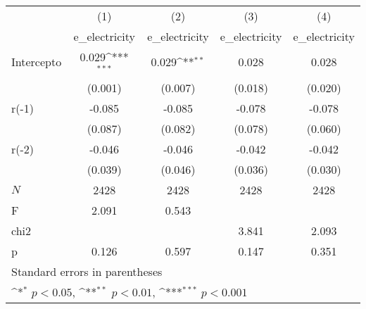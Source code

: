 {
\def\sym#1{\ifmmode^{#1}\else\(^{#1}\)\fi}
\begin{longtable}{l*{4}{c}}
\hline\hline\endfirsthead\hline\endhead\hline\endfoot\endlastfoot
            &\multicolumn{1}{c}{(1)}&\multicolumn{1}{c}{(2)}&\multicolumn{1}{c}{(3)}&\multicolumn{1}{c}{(4)}\\
            &\multicolumn{1}{c}{e\_electricity}&\multicolumn{1}{c}{e\_electricity}&\multicolumn{1}{c}{e\_electricity}&\multicolumn{1}{c}{e\_electricity}\\
\hline
Intercepto  &       0.029\sym{***}&       0.029\sym{**} &       0.028         &       0.028         \\
            &     (0.001)         &     (0.007)         &     (0.018)         &     (0.020)         \\
r(-1)       &      -0.085         &      -0.085         &      -0.078         &      -0.078         \\
            &     (0.087)         &     (0.082)         &     (0.078)         &     (0.060)         \\
r(-2)       &      -0.046         &      -0.046         &      -0.042         &      -0.042         \\
            &     (0.039)         &     (0.046)         &     (0.036)         &     (0.030)         \\
\hline
\(N\)       &        2428         &        2428         &        2428         &        2428         \\
F           &       2.091         &       0.543         &                     &                     \\
chi2        &                     &                     &       3.841         &       2.093         \\
p           &       0.126         &       0.597         &       0.147         &       0.351         \\
\hline\hline
\multicolumn{5}{l}{\footnotesize Standard errors in parentheses}\\
\multicolumn{5}{l}{\footnotesize \sym{*} \(p<0.05\), \sym{**} \(p<0.01\), \sym{***} \(p<0.001\)}\\
\end{longtable}
}
